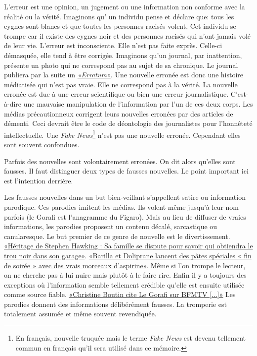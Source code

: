 \documentclass[11pt,a4paper,oldfontcommands]{memoir}
\begin{document}
L'erreur est une opinion, un jugement ou une information non conforme avec la réalité ou la vérité.
Imaginons qu' un individu pense et déclare que: tous les cygnes sont blancs et que toutes les personnes racisés volent.
Cet individu se trompe car il existe des cygnes noir et des personnes racisés qui n'ont jamais volé de leur vie.
L'erreur est inconsciente.
Elle n'est pas faite exprès.
Celle-ci démasquée, elle tend à être corrigée. Imaginons qu'un journal, par inattention, présente un photo qui ne correspond pas au sujet de sa chronique.
Le journal publiera par la suite un
\textit{\href{http://www.leparisien.fr/culture-loisirs/erratum-06-11-2016-6294522.php}{«Erratum»}}.
Une nouvelle erronée est donc une histoire médiatisée qui n'est pas vraie.
Elle ne correspond pas à la vérité.
La nouvelle erronée est due à une erreur scientifique ou bien une erreur journalistique.
C'est-à-dire une mauvaise manipulation de l'information par l'un de ces deux corps.
Les médias précautionneux corrigent leurs nouvelles erronées par des articles de démenti.
Ceci devrait être le code de déontologie des journalistes pour l'honnêteté intellectuelle.
Une \textit{Fake News}\footnote{En français, nouvelle truquée mais le terme \textit{Fake News} est devenu tellement commun
 en français qu'il sera utilisé dans ce mémoire.} n'est pas une nouvelle erronée.
Cependant elles sont souvent confondues.

Parfois des nouvelles sont volontairement erronées.
On dit alors qu'elles sont fausses.
Il faut distinguer deux types de fausses nouvelles.
Le point important ici est l'intention derrière.

Les fausses nouvelles dans un but bien-veillant s'appellent satire ou information parodique.
Ces parodies imitent les médias.
Ils volent même jusqu'à leur nom parfois (le Gorafi est l'anagramme du Figaro).
Mais au lieu de diffuser de vraies informations, les parodies proposent un contenu décalé, sarcastique ou canularesque.
Le but premier de ce genre de nouvelle est le divertissement.
\href{http://www.legorafi.fr/2018/03/28/heritage-de-stephen-hawking-sa-famille-se-dispute-pour-savoir-qui-obtiendra-le-trou-noir-dans-son-garage/}{«Héritage de Stephen Hawking : Sa famille se dispute pour savoir qui obtiendra le trou noir dans son garage»}.
\href{http://www.bilboquet-magazine.fr/barilla-doliprane-lancent-pates-speciales-fin-soiree-vrais-morceaux-daspirine/}{«Barilla et Doliprane lancent des pâtes spéciales « fin de soirée » avec des vrais morceaux d’aspirine»}.
Même si l'on trompe le lecteur, on ne cherche pas à lui nuire mais plutôt à le faire rire.
Enfin il y a toujours des exceptions où l'information semble tellement crédible qu'elle est ensuite utilisée comme source fiable. \href{http://leplus.nouvelobs.com/contribution/1141462-christine-boutin-cite-le-gorafi-sur-bfmtv-si-j-etais-pro-manif-pour-tous-j-aurais-honte.html}{«Christine Boutin cite Le Gorafi sur BFMTV [...]»}
Les parodies donnent des informations délibérément fausses.
La tromperie est totalement assumée et même souvent revendiquée.
\end{document}
